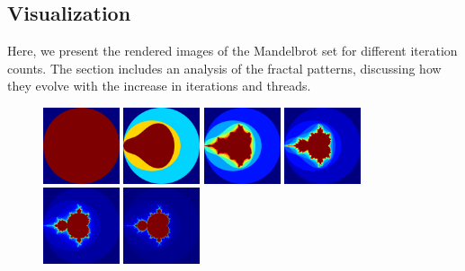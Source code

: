 \documentclass[11pt]{article}
\begin{document}
\subsection{Visualization}
Here, we present the rendered images of the Mandelbrot set for different iteration counts. The section includes an analysis of the fractal patterns, discussing how they evolve with the increase in iterations and threads.

    \begin{figure}[ht]
        \centering
        \includegraphics[width=0.2\textwidth]{img/F_0002.png}
        \includegraphics[width=0.2\textwidth]{img/F_0004.png}
        \includegraphics[width=0.2\textwidth]{img/F_0008.png}
        \includegraphics[width=0.2\textwidth]{img/F_0016.png}
        \includegraphics[width=0.2\textwidth]{img/F_0032.png}
        \includegraphics[width=0.2\textwidth]{img/F_0064.png}

\end{figure}
\end{document}
